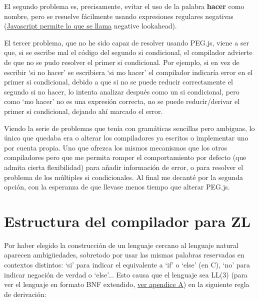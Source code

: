 \documentclass{report}
\begin{document}
			\vspace{10px}
			
			El segundo problema es, precisamente, evitar el uso de la palabra \textbf{hacer} como nombre, pero se resuelve fácilmente usando expresiones regulares negativas (\hyperref[app:c]{Javascript permite lo que se llama} negative lookahead\cite{lookahead}). 
			
			\vspace{10px}
			
			El tercer problema, que no he sido capaz de resolver usando PEG.js, viene a ser que, si se escribe mal el código del segundo si condicional, el compilador advierte de que no se pudo resolver el primer si condicional. Por ejemplo, si en vez de escribir `si no hacer' se escribiera `si mo hacer' el compilador indicaría error en el primer si condicional, debido a que si no se puede reducir correctamente el segundo si no hacer, lo intenta analizar después como un si condicional, pero como `mo hacer' no es una expresión correcta, no se puede reducir/derivar el primer si condicional, dejando ahí marcado el error.
			
			\vspace{10px}
			
			Viendo la serie de problemas que tenía con gramáticas sencillas pero ambiguas, lo único que quedaba era o alterar los compiladores ya escritos o implementar uno por cuenta propia. Uno que ofrezca los mismos mecanismos que los otros compiladores pero que me permita romper el comportamiento por defecto (que admita cierta flexibilidad) para añadir información de error, o para resolver el problema de los múltiples si condicionales. Al final me decanté por la segunda opción, con la esperanza de que llevase menos tiempo que alterar PEG.js.
	
	\section{Estructura del compilador para ZL}
	
	Por haber elegido la construcción de un lenguaje cercano al lenguaje natural aparecen ambigüedades, sobretodo por usar las mismas palabras reservadas en contextos distintos: `si' para indicar el equivalente a `if' o `else' (en C), `no' para indicar negación de verdad o `else'... Esto causa que el lenguaje sea LL(3) (para ver el lenguaje en formato BNF extendido, \hyperref[app:a]{ver apendice A}) en la siguiente regla de derivación:
	
	\vspace{10px}
	
\end{document}
